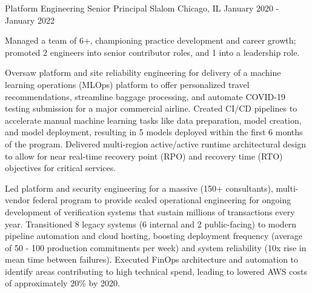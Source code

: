 \begin{cventries}
  \cventry
    {Platform Engineering Senior Principal} %
    {Slalom} %
    {Chicago, IL} %
    {January 2020 - January 2022} %
    {
      \begin{cvitems} %
        \item {Managed a team of 6+, championing practice development and career growth; promoted 2 engineers into senior contributor roles, and 1 into a leadership role.}
        \item {Oversaw platform and site reliability engineering for delivery of a machine learning operations (MLOps) platform to offer personalized travel recommendations, streamline baggage processing, and automate COVID-19 testing submission for a major commercial airline. Created CI/CD pipelines to accelerate manual machine learning tasks like data preparation, model creation, and model deployment, resulting in 5 models deployed within the first 6 months of the program. Delivered multi-region active/active runtime architectural design to allow for near real-time recovery point (RPO) and recovery time (RTO) objectives for critical services.}
        \item {Led platform and security engineering for a massive (150+ consultants), multi-vendor federal program to provide scaled operational engineering for ongoing development of verification systems that sustain millions of transactions every year. Transitioned 8 legacy systems (6 internal and 2 public-facing) to modern pipeline automation and cloud hosting, boosting deployment frequency (average of 50 - 100 production commitments per week) and system reliability (10x rise in mean time between failures). Executed FinOps architecture and automation to identify areas contributing to high technical spend, leading to lowered AWS costs of approximately 20\% by 2020.}
      \end{cvitems}
    }


\end{cventries}
